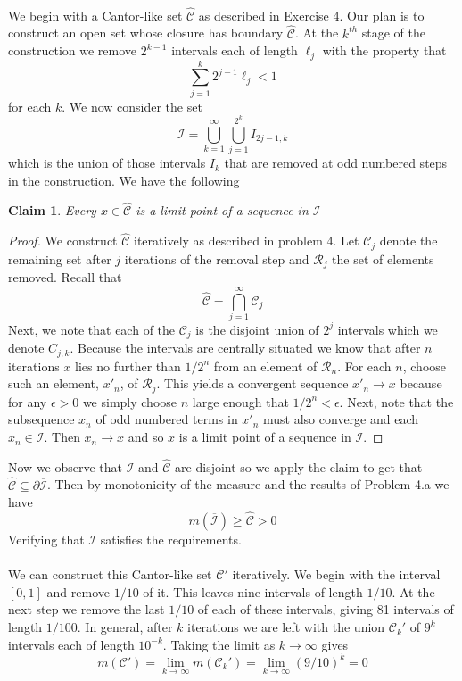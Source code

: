 \documentclass{article}
\newcommand{\problem}[1]{\noindent{\textbf{Problem #1}}\\}
\newtheorem*{claim}{Claim}
\begin{document}
\problem{1.6.9} We begin with a Cantor-like set $\hat{\mathcal{C}}$ as described in Exercise 4. Our plan is to construct an open set whose closure has boundary $\hat{\mathcal{C}}$. At the $k^{th}$ stage of the construction we remove $2^{k-1}$ intervals each of length $\ell_j$ with the property that 
\[
\sum_{j=1}^k 2^{j-1}\ell_j < 1
\]
for each $k$. We now consider the set 
\[
\mathcal{I} = \bigcup_{k=1}^\infty \bigcup_{j=1}^{2^k} I_{2j-1, k}
\]
which is the union of those intervals $I_k$ that are removed at odd numbered steps in the construction. We have the following
\begin{claim}
Every $x \in \hat{\mathcal{C}}$ is a limit point of a sequence in $\mathcal{I}$
\end{claim}
\begin{proof}
We construct $\hat{\mathcal{C}}$ iteratively as described in problem 4. Let $\mathcal{C}_j$ denote the remaining set after $j$ iterations of the removal step and $\mathcal{R}_j$ the set of elements removed. Recall that 
\[
\hat{\mathcal{C}} = \bigcap_{j=1}^\infty \mathcal{C}_j
\]
Next, we note that each of the $\mathcal{C}_j$ is the disjoint union of $2^j$ intervals which we denote $C_{j,k}$. Because the intervals are centrally situated we know that after $n$ iterations $x$ lies no further than $1/2^n$ from an element of $\mathcal{R}_n$. For each $n$, choose such an element, $x'_n$, of $\mathcal{R}_j$. This yields a convergent sequence $x'_n \to x$ because for any $\epsilon > 0$ we simply choose $n$ large enough that $1/2^n < \epsilon$. Next, note that the subsequence $x_n$ of odd numbered terms in $x'_n$ must also converge and each $x_n \in \mathcal{I}$. Then $x_n \to x$ and so $x$ is a limit point of a sequence in $\mathcal{I}$.
\end{proof}
Now we observe that $\mathcal{I}$ and $\hat{\mathcal{C}}$ are disjoint so we apply the claim to get that $\hat{\mathcal{C}} \subseteq \partial\overline{\mathcal{I}}$. Then by monotonicity of the measure and the results of Problem 4.a we have
\[
m(\overline{\mathcal{I}}) \geq \hat{\mathcal{C}} > 0
\]
Verifying that $\mathcal{I}$ satisfies the requirements. \\

\problem{1.6.11} We can construct this Cantor-like set $\mathcal{C}'$ iteratively. We begin with the interval $[0,1]$ and remove $1/10$ of it. This leaves nine intervals of length $1/10$. At the next step we remove the last $1/10$ of each of these intervals, giving 81 intervals of length $1/100$. In general, after $k$ iterations we are left with the union $\mathcal{C}_k'$ of $9^k$ intervals each of length $10^{-k}$. Taking the limit as $k\to\infty$ gives
\[
m(\mathcal{C}') = \lim_{k\to\infty} m(\mathcal{C}_k') = \lim_{k\to\infty} (9/10)^k = 0
\]
\end{document}
